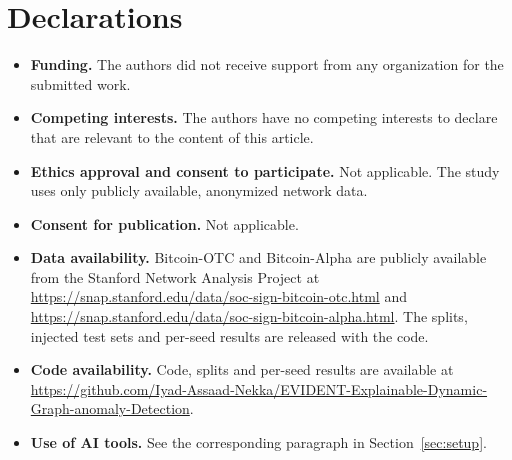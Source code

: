 \documentclass[pdflatex,sn-basic]{sn-jnl}
\theoremstyle{definition}
\theoremstyle{plain}
\begin{document}
\backmatter

\section*{Declarations}

\begin{itemize}
\item \textbf{Funding.} The authors did not receive support from any
organization for the submitted work.
\item \textbf{Competing interests.} The authors have no competing interests
to declare that are relevant to the content of this article.
\item \textbf{Ethics approval and consent to participate.} Not applicable. The
study uses only publicly available, anonymized network data.
\item \textbf{Consent for publication.} Not applicable.
\item \textbf{Data availability.} Bitcoin-OTC and Bitcoin-Alpha are publicly
available from the Stanford Network Analysis Project at
\url{https://snap.stanford.edu/data/soc-sign-bitcoin-otc.html} and
\url{https://snap.stanford.edu/data/soc-sign-bitcoin-alpha.html}. The splits,
injected test sets and per-seed results are released with the code.
\item \textbf{Code availability.} Code, splits and per-seed results are
available at
\url{https://github.com/Iyad-Assaad-Nekka/EVIDENT-Explainable-Dynamic-Graph-anomaly-Detection}.
\item \textbf{Use of AI tools.} See the corresponding paragraph in
Section~\ref{sec:setup}.
\end{itemize}
\end{document}
